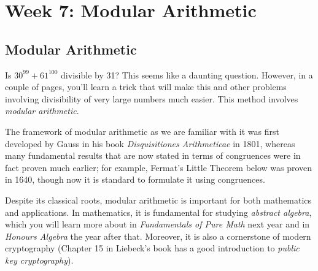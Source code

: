 \documentclass[11pt,dvipsnames]{book}
\numberwithin{figure}{section} %
\numberwithin{table}{section} %
\begin{document}
%
%


\part{Week 7: Modular Arithmetic}


\chapter{Modular Arithmetic}%
\label{modular}

%

\indent Is $30^{99}+61^{100}$  divisible by 31? This seems like a daunting question. However, in a couple of pages, you'll learn a trick that will make this and other problems involving divisibility of very large numbers much easier. This method involves {\it modular arithmetic}.

The framework of modular arithmetic as we are familiar with it was first developed by Gauss in his book {\it  Disquisitiones Arithmeticae} in 1801, whereas many fundamental results that are now stated in terms of congruences were in fact proven much earlier; for example, Fermat's Little Theorem below was proven in 1640, though now it is standard to formulate it using congruences.

Despite its classical roots, modular arithmetic is important for both mathematics and applications. In mathematics, it is fundamental for studying {\it abstract algebra}, which you will learn more about in {\it Fundamentals of Pure Math} next year and in {\it Honours Algebra} the year after that. Moreover, it is also a cornerstone of modern cryptography (Chapter 15 in Liebeck's book has a good introduction to {\it public key cryptography}). \\
\end{document}
